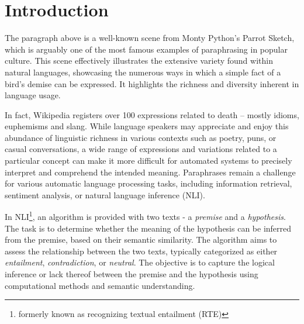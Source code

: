 \chapter*{Introduction}




The paragraph above is a well-known scene from Monty Python's Parrot Sketch, which is arguably one of the most famous examples of paraphrasing in popular culture. This scene effectively illustrates the extensive variety found within natural languages, showcasing the numerous ways in which a simple fact of a bird's demise can be expressed. It highlights the richness and diversity inherent in language usage.

In fact, Wikipedia registers over 100 expressions related to death -- mostly idioms, euphemisms and slang.  \citep{wiki:death} While language speakers may appreciate and enjoy this abundance of linguistic richness in various contexts such as poetry, puns, or casual conversations, a wide range of expressions and variations related to a particular concept can make it more difficult for automated systems to precisely interpret and comprehend the intended meaning. Paraphrases remain a challenge for various automatic language processing tasks, including information retrieval, sentiment analysis, or natural language inference (NLI).

In NLI\footnote{formerly known as recognizing textual entailment (RTE)}, an algorithm is provided with two texts - a \emph{premise} and a \emph{hypothesis}. The task is to determine whether the meaning of the hypothesis can be inferred from the premise, based on their semantic similarity. The algorithm aims to assess the relationship between the two texts, typically categorized as either \emph{entailment}, \emph{contradiction}, or \emph{neutral}. The objective is to capture the logical inference or lack thereof between the premise and the hypothesis using computational methods and semantic understanding. \citep{dagan:2005} 


